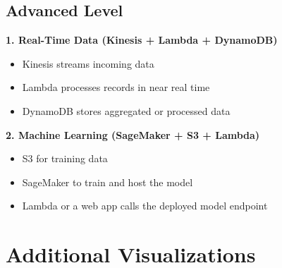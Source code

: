 \documentclass[11pt]{article}
\begin{document}
\subsection{Advanced Level}
\textbf{1. Real-Time Data (Kinesis + Lambda + DynamoDB)}
\begin{itemize}
    \item Kinesis streams incoming data
    \item Lambda processes records in near real time
    \item DynamoDB stores aggregated or processed data
\end{itemize}

\textbf{2. Machine Learning (SageMaker + S3 + Lambda)}
\begin{itemize}
    \item S3 for training data
    \item SageMaker to train and host the model
    \item Lambda or a web app calls the deployed model endpoint
\end{itemize}

\begin{center}
\end{center}

\clearpage

\section{Additional Visualizations}
\end{document}
